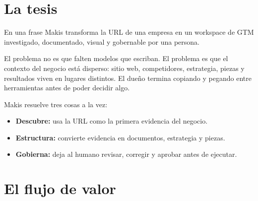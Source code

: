 \documentclass{loopmind-doc}
\begin{document}
\makecover

\section{La tesis}

\begin{callouttitled}{En una frase}
Makis transforma la URL de una empresa en un workspace de GTM investigado, documentado, visual y gobernable por una persona.
\end{callouttitled}

El problema no es que falten modelos que escriban. El problema es que el contexto del negocio está disperso: sitio web, competidores, estrategia, piezas y resultados viven en lugares distintos. El dueño termina copiando y pegando entre herramientas antes de poder decidir algo.

Makis resuelve tres cosas a la vez:
\begin{itemize}
  \item \textbf{Descubre:} usa la URL como la primera evidencia del negocio.
  \item \textbf{Estructura:} convierte evidencia en documentos, estrategia y piezas.
  \item \textbf{Gobierna:} deja al humano revisar, corregir y aprobar antes de ejecutar.
\end{itemize}

\begin{center}
\end{center}

\section{El flujo de valor}
\end{document}
